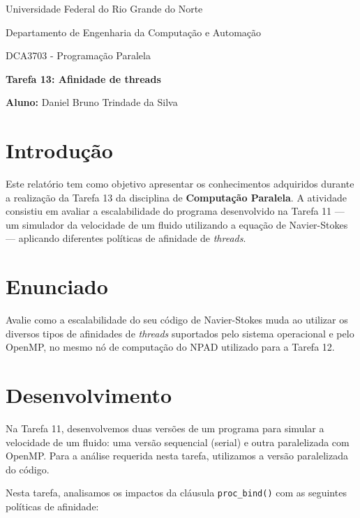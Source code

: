 \documentclass[a4paper, 12pt]{article}
\begin{document}
	\begin{center}
		Universidade Federal do Rio Grande do Norte
		
		Departamento de Engenharia da Computação e Automação  
		
		DCA3703 - Programação Paralela  
		
		\textbf{Tarefa 13: Afinidade de threads}  
		
		\textbf{Aluno:} Daniel Bruno Trindade da Silva  
	\end{center}  
	
	\section{Introdução}
	
	\hspace{0.62cm}Este relatório tem como objetivo apresentar os conhecimentos adquiridos durante a realização da Tarefa 13 da disciplina de \textbf{Computação Paralela}. A atividade consistiu em avaliar a escalabilidade do programa desenvolvido na Tarefa 11 — um simulador da velocidade de um fluido utilizando a equação de Navier-Stokes — aplicando diferentes políticas de afinidade de \textit{threads}.
	
	\section{Enunciado}
	
	\hspace{0.62cm}Avalie como a escalabilidade do seu código de Navier-Stokes muda ao utilizar os diversos tipos de afinidades de \textit{threads} suportados pelo sistema operacional e pelo OpenMP, no mesmo nó de computação do NPAD utilizado para a Tarefa 12.
	
	\section{Desenvolvimento}
	
	\hspace{0.62cm}Na Tarefa 11, desenvolvemos duas versões de um programa para simular a velocidade de um fluido: uma versão sequencial (serial) e outra paralelizada com OpenMP. Para a análise requerida nesta tarefa, utilizamos a versão paralelizada do código.
	
	Nesta tarefa, analisamos os impactos da cláusula \texttt{proc\_bind()} com as seguintes políticas de afinidade:
	
\end{document}
